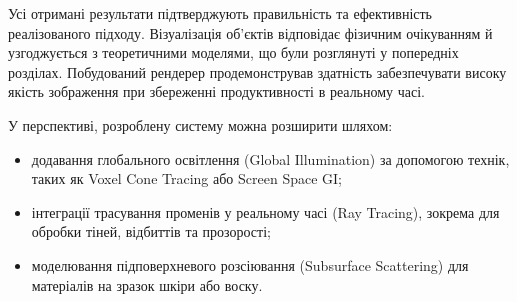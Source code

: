 \par Усі отримані результати підтверджують правильність та ефективність реа\-лізованого підходу. Візуалізація об’єктів відповідає фізичним очікуванням й узгоджується з теоретичними моделями, що були розглянуті у попередніх розділах. Побудований рендерер продемонстрував здатність забезпечувати високу якість зображення при збереженні продуктивності в реальному часі.

\par У перспективі, розроблену систему можна розширити шляхом:
\begin{itemize}
    \item додавання глобального освітлення (Global Illumination) за допомогою технік, таких як Voxel Cone Tracing або Screen Space GI;
    \item інтеграції трасування променів у реальному часі (Ray Tracing), зокрема для обробки тіней, відбиттів та прозорості;
    \item моделювання підповерхневого розсіювання (Subsurface Scattering) для матеріалів на зразок шкіри або воску.
\end{itemize}
